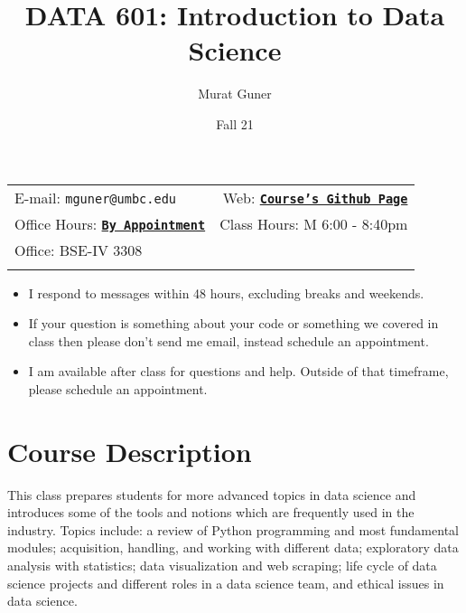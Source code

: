 \documentclass[11pt]{article}
\title{DATA 601: Introduction to Data Science}
\author{Murat Guner}
\date{Fall 21}
\newcommand{\blankline}{\quad\pagebreak[2]}
\begin{document}
\maketitle

\blankline

\begin{tabular*}{.93\textwidth}{@{\extracolsep{\fill}}lr}



E-mail: \texttt{mguner@umbc.edu} & Web: \href{https://github.com/mguner/601_Fall21_Thursday}{\tt\bf Course's Github Page}  \\

 Office Hours: \href{https://calendly.com/mguner/fall21-officehours}{\tt\bf By Appointment} &  Class Hours: M 6:00 - 8:40pm \\

 Office: BSE-IV 3308 \\
 & \\
\hline
\end{tabular*}


\vspace{5 mm}

\begin{itemize}
	\item I respond to messages within 48 hours, excluding breaks and weekends.
	\item If your question is something about your code or something we covered in class then please don't send me email, instead schedule an appointment.
	\item I am available after class for questions and help. Outside of that timeframe, please schedule an appointment.
\end{itemize}


\section*{Course Description}

This class prepares students for more advanced topics in data science and introduces some of the tools and notions which are frequently used in the industry. Topics include: a review of Python programming and most fundamental modules; acquisition, handling, and working with different data; exploratory data analysis with statistics; data visualization and web scraping; life cycle of data science projects and different roles in a data science team, and ethical issues in data science.
\end{document}
